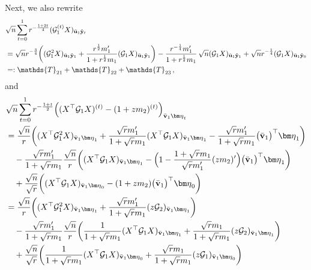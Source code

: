 \documentclass[12pt]{article}
\numberwithin{equation}{section}
\theoremstyle{remark}
\newcommand{\1}{{\rm 1}\kern-0.24em{\rm I}}
\begin{document}
\begin{appendices}
  Next, we also rewrite 
 \begin{align}\label{eq:Rewrite2}
 &\sqrt n \sum_{t=0}^1 r^{-\frac{1+2t}{4}} ( \mathcal{G}_1^{(t)} {X})_{\bar{\bf u}_1\tilde{{\bf y}}_t} \notag\\
 &=\sqrt n r^{-\frac 34}\bigg( (\mathcal{G}_1^2{X})_{\bar{\bf u}_1\tilde{{\bf y}}_1}  +  \frac{r^{\frac 12}  m_1'}{1+r^{\frac 12} m_1}(\mathcal{G}_1{X})_{\bar{\bf u}_1\tilde{{\bf y}}_1}\bigg) - \frac{r^{-\frac14} m_1'}{1+r^{\frac 12}  m_1} \,\sqrt n (\mathcal{G}_1{X})_{\bar{\bf u}_1\tilde{{\bf y}}_1} + \sqrt n r^{-\frac 14} (\mathcal{G}_1{X})_{\bar{\bf u}_1\tilde{{\bf y}}_0} \notag\\
 &=: \mathds{T}_{21} + \mathds{T}_{22}+ \mathds{T}_{23}\,,
 \end{align}
 and 
  \begin{align}\label{eq:Rewrite3}
 &{\sqrt n} \sum_{t=0}^1  r^{-\frac{1+t}{2}}\Big(({X}^{\top} \mathcal{G}_1{X})^{(t)}-(1+zm_2)^{(t)}\Big)_{\bar{\bf v}_1{\bm \eta}_t} \notag\\
& =\frac{\sqrt n}{ r}\bigg( ({X}^{\top} \mathcal{G}_1^2{X})_{\bar{\bf v}_1{\bm \eta}_1} 
+ \frac{\sqrt r m_1'}{1+\sqrt r m_1}  ({X}^{\top} \mathcal{G}_1{X})_{\bar{\bf v}_1{\bm \eta}_1} -  \frac{\sqrt r m_1'}{1+ \sqrt r m_1} {\big(\bar{\bf v}_1\big)^{\top}{\bm \eta}_1} \bigg) \notag\\
&\quad - \frac{\sqrt r m_1'}{1+\sqrt r m_1} \frac{\sqrt n}{ r}  \bigg(({X}^{\top} \mathcal{G}_1{X})_{\bar{\bf v}_1{\bm \eta}_1} - \Big(1-\frac{1+\sqrt r m_1}{\sqrt r m_1'} (zm_2)' \Big) {\big(\bar{\bf v}_1\big)^{\top}{\bm \eta}_1} \bigg) \notag\\
& \quad + \frac{\sqrt n}{\sqrt r} \bigg( ({X}^{\top} \mathcal{G}_1{X})_{\bar{\bf v}_1{\bm \eta}_0} 
- (1+zm_2) {\big(\bar{\bf v}_1\big)^{\top}{\bm \eta}_0}\bigg) \notag\\
&=\frac{\sqrt n}{ r}\bigg( ({X}^{\top} \mathcal{G}_1^2{X})_{\bar{\bf v}_1{\bm \eta}_1} 
+ \frac{\sqrt r m_1'}{1+\sqrt r m_1}  (z \mathcal{G}_2)_{\bar{\bf v}_1{\bm \eta}_1} \bigg) \notag\\
&\quad - \frac{\sqrt r m_1'}{1+\sqrt r m_1} \frac{\sqrt n}{ r}\bigg( \frac{1}{1+ \sqrt r m_1} ({X}^{\top} \mathcal{G}_1{X})_{\bar{\bf v}_1{\bm \eta}_1} + \frac{\sqrt r m_1}{1+\sqrt r m_1}  (z\mathcal{G}_2)_{\bar{\bf v}_1{\bm \eta}_1} \bigg) \notag\\
& \quad +\frac{\sqrt n}{\sqrt r} \bigg(\frac{1}{1+ \sqrt r m_1} ({X}^{\top} \mathcal{G}_1{X})_{\bar{\bf v}_1{\bm \eta}_0} + \frac{\sqrt r m_1}{1+\sqrt r m_1}  (z \mathcal{G}_1)_{\bar{\bf v}_1{\bm \eta}_0} \bigg) \notag\\

\end{align}
\end{appendices}
\end{document}
